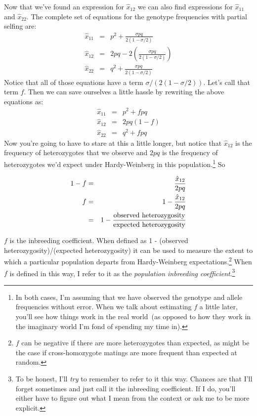 Now that we've found an expression for $\hat x_{12}$ we can also find
expressions for $\hat x_{11}$ and $\hat x_{22}$. The complete set of
equations for the genotype frequencies with partial selfing are:
\begin{eqnarray}
\hat x_{11} &=& p^2 + \frac{\sigma pq}{2(1-\sigma/2)} \\
\hat x_{12} &=& 2pq - 2\left(\frac{\sigma pq}{2(1-\sigma/2)}\right) \\
\hat x_{22} &=& q^2 + \frac{\sigma pq}{2(1-\sigma/2)} 
\end{eqnarray}
Notice that all of those equations have a term
$\sigma/(2(1-\sigma/2))$. Let's call that term $f$. Then we can save
ourselves a little hassle by rewriting the above equations as:
\begin{eqnarray}
\hat x_{11} &=& p^2 + fpq \\
\hat x_{12} &=& 2pq(1-f) \\
\hat x_{22} &=& q^2 + fpq
\end{eqnarray}
Now you're going to have to stare at this a little longer, but notice
that $\hat x_{12}$ is the frequency of heterozygotes that we observe
and $2pq$ is the frequency of heterozygotes we'd expect under
Hardy-Weinberg in this population.\footnote{In both cases, I'm
  assuming that we have observed the genotype and allele frequencies
  without error. When we talk about estimating $f$ a little later,
  you'll see how things work in the real world~(as opposed to how they
  work in the imaginary world I'm fond of spending my time in).} So

\begin{eqnarray}
1-f &=& \frac{\hat x_{12}}{2pq} \\
  f &=& 1 - \frac{\hat x_{12}}{2pq} \\
    &=& 1 - \frac{\hbox{observed heterozygosity}}%
                 {\hbox{expected heterozygosity}}
\end{eqnarray}

$f$ is the inbreeding coefficient. When defined as 1 - (observed
heterozygosity)/(expected heterozygosity) it can be used to measure
the extent to which a particular population departs from
Hardy-Weinberg expectations.\footnote{$f$ can be negative if there are
  more heterozygotes than expected, as might be the case if
  cross-homozygote matings are more frequent than expected at random.}
When $f$ is defined in this way, I refer to it as the {\it population
  inbreeding coefficient}.\footnote{To be honest, I'll {\it try\/} to
  remember to refer to it this way. Chances are that I'll forget
  sometimes and just call it the inbreeding coefficient. If I do,
  you'll either have to figure out what I mean from the context or ask
  me to be more explicit.}

